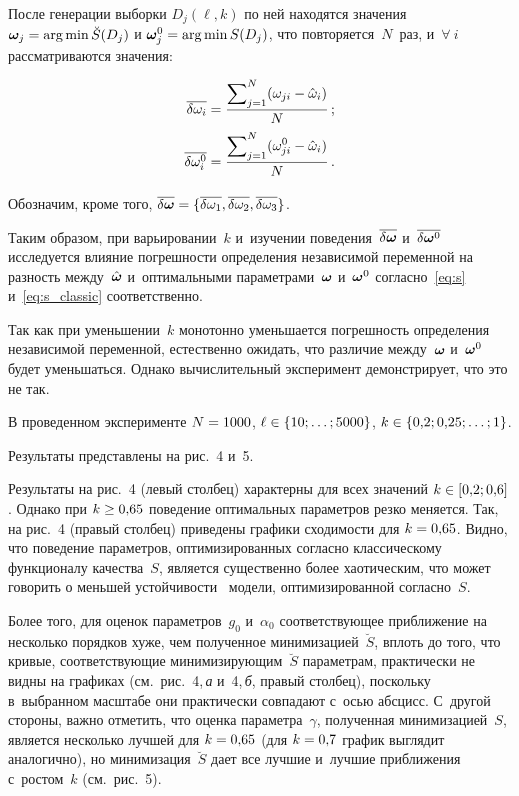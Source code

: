 \begin{multicols}{2}
После генерации выборки $D_j(\ell, k)$ по ней находятся значения $\bomega_j \hm= 
\arg \min \breve{S}(D_j)$
и $\bomega_j^0 \hm= \arg \min S(D_j)$, что повторяется~$N$~раз, и~$\forall\ i$ 
рассматриваются значения:

\noindent
\begin{align*}
  \overline{\delta \omega_i} &= \displaystyle\frac{\displaystyle \sum\nolimits_{j = 1}^N (\omega_{ji} - 
\hat{\omega}_i)\mathstrut}{\displaystyle N\mathstrut}\,;
\\
  \overline{\delta \omega^0_i} &= \displaystyle\frac{\displaystyle \sum\nolimits_{j = 1}^N (\omega^0_{ji} - 
\hat{\omega}_i)\mathstrut}{\displaystyle N\mathstrut}\,.
\end{align*}

\vspace*{-4pt}

Обозначим, кроме того, $\overline{\delta \bomega} \hm= \{ \overline{\delta 
\omega_1}, \overline{\delta \omega_2}, \overline{\delta \omega_3} \}$.

Таким образом, при варьировании~$k$ и~изуче\-нии поведения~$\overline{\delta 
\boldsymbol{\omega}}$ и~$\overline{\delta \boldsymbol{\omega}^0}$ исследуется влияние по\-греш\-ности определения
независимой переменной на раз\-ность между~$\hat{\boldsymbol{\omega}}$ и~оптимальными
па\-ра\-мет\-ра\-ми~$\boldsymbol{\omega}$ и~$\boldsymbol{\omega}^0$ согласно~\eqref{eq:s} и~\eqref{eq:s_classic}
соответст\-венно.
{

}

Так как при уменьшении~$k$ монотонно уменьшается погрешность определения 
независимой перемен\-ной, естественно ожидать, что различие между~$\boldsymbol{\omega}$ и~$\boldsymbol{\omega}^0$ 
будет уменьшаться. Однако вы\-чис\-ли\-тельный эксперимент демонстрирует, что это не так.

В проведенном эксперименте $N \hm= 1000$, $\ell \hm\in \{ 10; \dots; 5000 \}$,
$k \hm\in \{ 0{,}2; 0{,}25; \dots; 1 \}$.

Результаты представлены на рис.~4 и~5.






Результаты на рис.~4 (левый столбец) характерны для всех
значений $k \hm\in [0{,}2; 0{,}6]$. Однако при $k\hm \geq 0{,}65$ 
поведение оптимальных
параметров резко меняется. Так, на рис.~4 (правый столбец) приведены
графики сходимости для $k\hm = 0{,}65$. Видно, что поведение параметров,
оптимизированных согласно классическому функционалу качества~$S$, является
существенно более хаотическим, что может говорить о меньшей 
устойчивости~\cite{Rudoy16StabilityAnalysis} модели, оптимизированной согласно~$S$.

Более того, для оценок параметров~$g_0$ и~$\alpha_0$ соответствующее
приближение на несколько порядков хуже, чем полученное минимизацией~$\breve{S}$,
вплоть до того, что кривые, соответствующие минимизирующим~$\breve{S}$ 
параметрам,
практически не видны на графиках (см.\ рис.~4,\,\textit{а} 
и~4,\,\textit{б}, правый столбец), поскольку в~выбранном масштабе они
практически совпадают с~осью абсцисс. С~другой стороны, важно отметить, что 
оценка параметра~$\gamma$, полученная минимизацией~$S$, 
является несколько лучшей для
$k \hm= 0{,}65$ (для $k \hm= 0{,}7$ график выглядит аналогично), но 
минимизация~$\breve{S}$
дает все лучшие и~лучшие приближения с~ростом~$k$ (см.\ 
рис.~5).


\end{multicols}
